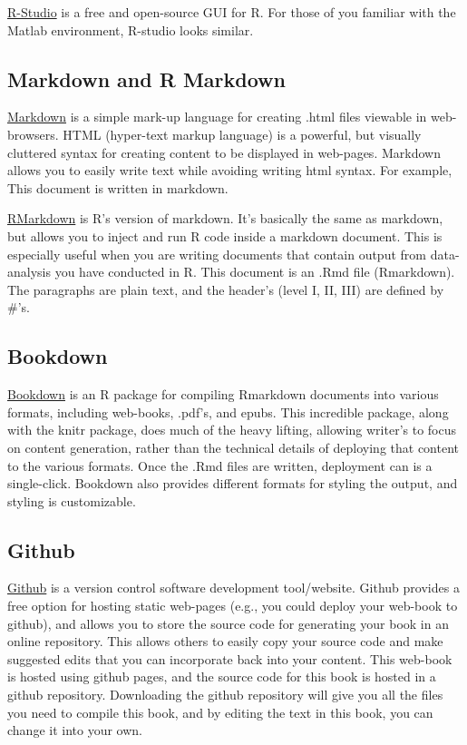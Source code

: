 \documentclass[
]{book}
\begin{document}
\href{https://www.rstudio.com}{R-Studio} is a free and open-source GUI for R. For those of you familiar with the Matlab environment, R-studio looks similar.

\hypertarget{markdown-and-r-markdown}{%
\subsection{Markdown and R Markdown}\label{markdown-and-r-markdown}}

\href{https://github.com/adam-p/markdown-here/wiki/Markdown-Cheatsheet}{Markdown} is a simple mark-up language for creating .html files viewable in web-browsers. HTML (hyper-text markup language) is a powerful, but visually cluttered syntax for creating content to be displayed in web-pages. Markdown allows you to easily write text while avoiding writing html syntax. For example, This document is written in markdown.

\href{http://rmarkdown.rstudio.com}{RMarkdown} is R's version of markdown. It's basically the same as markdown, but allows you to inject and run R code inside a markdown document. This is especially useful when you are writing documents that contain output from data-analysis you have conducted in R. This document is an .Rmd file (Rmarkdown). The paragraphs are plain text, and the header's (level I, II, III) are defined by \#'s.

\hypertarget{bookdown}{%
\subsection{Bookdown}\label{bookdown}}

\href{https://bookdown.org/yihui/bookdown/}{Bookdown} is an R package for compiling Rmarkdown documents into various formats, including web-books, .pdf's, and epubs. This incredible package, along with the knitr package, does much of the heavy lifting, allowing writer's to focus on content generation, rather than the technical details of deploying that content to the various formats. Once the .Rmd files are written, deployment can is a single-click. Bookdown also provides different formats for styling the output, and styling is customizable.

\hypertarget{github}{%
\subsection{Github}\label{github}}

\href{https://github.com}{Github} is a version control software development tool/website. Github provides a free option for hosting static web-pages (e.g., you could deploy your web-book to github), and allows you to store the source code for generating your book in an online repository. This allows others to easily copy your source code and make suggested edits that you can incorporate back into your content. This web-book is hosted using github pages, and the source code for this book is hosted in a github repository. Downloading the github repository will give you all the files you need to compile this book, and by editing the text in this book, you can change it into your own.
\end{document}
